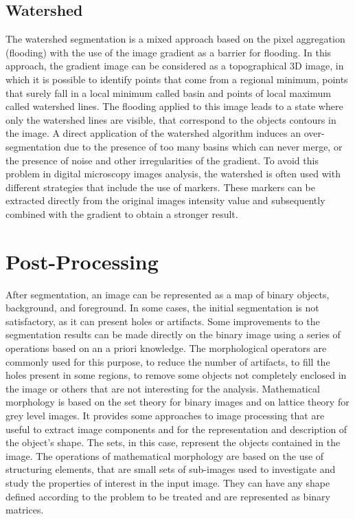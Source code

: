 \documentclass[final,a4paper,12pt,english]{UnicaPhdThesis3}
\begin{document}
\subsection{Watershed} \label{watershed} %
The watershed segmentation \cite{Meyer} is a mixed approach based on the pixel aggregation (flooding) with the use of the image gradient as a barrier for flooding. In this approach, the gradient image can be considered as a topographical 3D image, in which it is possible to identify points that come from a regional minimum, points that surely fall in a local minimum called basin and points of local maximum called watershed lines. The flooding applied to this image leads to a state where only the watershed lines are visible, that correspond to the objects contours in the image. A direct application of the watershed algorithm induces an over-segmentation due to the presence of too many basins which can never merge, or the presence of noise and other irregularities of the gradient. To avoid this problem in digital microscopy images analysis, the watershed is often used with different strategies that include the use of markers. These markers can be extracted directly from the original images intensity value and subsequently combined with the gradient to obtain a stronger result.

\section{Post-Processing} \label{postp}
After segmentation, an image can be represented as a map of binary objects, background, and foreground. In some cases, the initial segmentation is not satisfactory, as it can present holes or artifacts. Some improvements to the segmentation results can be made directly on the binary image using a series of operations based on an a priori knowledge. The morphological operators are commonly used for this purpose, to reduce the number of artifacts, to fill the holes present in some regions, to remove some objects not completely enclosed in the image or others that are not interesting for the analysis. Mathematical morphology is based on the set theory for binary images \cite{Serra, Serra2} and on lattice theory for grey level images. It provides some approaches to image processing that are useful to extract image components and for the representation and description of the object's shape. The sets, in this case, represent the objects contained in the image. The operations of mathematical morphology are based on the use of structuring elements, that are small sets of sub-images used to investigate and study the properties of interest in the input image. They can have any shape defined according to the problem to be treated and are represented as binary matrices.
\end{document}

